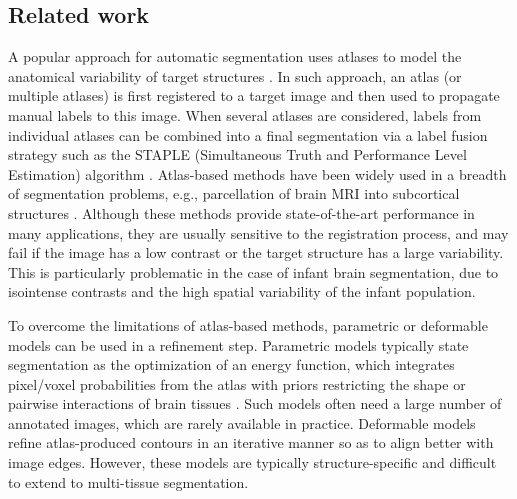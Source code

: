 \documentclass[twoside,espcrc2]{elsarticle}
\begin{document}
\subsection{Related work}
\label{ssec:relatedWork}

A popular approach for automatic segmentation uses atlases to model the anatomical variability of target structures \cite{prastawa2005automatic,weisenfeld2006segmentation,song2007clinical,weisenfeld2009automatic,shi2010neonatal,shi2010construction,shi2011infant,melbourne2012neobrains12,cardoso2013adapt,wang2014segmentation}. In such approach, an atlas (or multiple atlases) is first registered to a target image and then used to propagate manual labels to this image. When several atlases are considered, labels from individual atlases can be combined into a final segmentation via a label fusion strategy \cite{weisenfeld2006segmentation,weisenfeld2009automatic,wang2012atlas} such as the STAPLE (Simultaneous Truth and Performance Level Estimation) algorithm \cite{warfield2004simultaneous}. Atlas-based methods have been widely used in a breadth of segmentation problems, e.g.,
parcellation of brain MRI into subcortical structures \cite{dolz2015segmentation}. Although these methods provide state-of-the-art performance in many applications, they are usually sensitive to the registration process, and may fail if the image has a low contrast or the target structure has a large variability. This is particularly problematic in the case of infant brain segmentation, due to isointense contrasts and the high spatial variability of the infant population. 

To overcome the limitations of atlas-based methods, parametric \cite{prastawa2005automatic,xue2007automatic,ledig2012neonatal,wu2012automatic,cardoso2013adapt} or deformable \cite{wang2011automatic} models can be used in a refinement step. Parametric models typically state segmentation as the optimization of an energy function, which integrates pixel/voxel probabilities from the atlas with priors restricting the shape or pairwise interactions of brain tissues \cite{xue2007automatic,ledig2012neonatal,melbourne2012neobrains12,cardoso2013adapt}. %
Such models often need a large number of annotated images, which are rarely available in practice. Deformable models refine atlas-produced contours in an iterative manner so as to align better with image edges. However, these models are typically structure-specific and difficult to extend to multi-tissue segmentation. 
\end{document}
